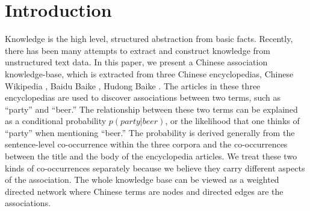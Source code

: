 \section{Introduction}
%
Knowledge is the high level, structured abstraction from basic facts.
Recently, there has been many attempts to extract and construct knowledge
from unstructured text data\cite{WuLWZ12,HoffartSBW13}.
In this paper, we present a Chinese association knowledge-base,
which is extracted from three Chinese encyclopedias,
Chinese Wikipedia \cite{ch-wiki}, Baidu Baike
\cite{baidu-baike}, Hudong Baike \cite{hudong-baike}.
The articles in these three encyclopedias are used to discover associations
between two terms, such as ``party'' and ``beer.''
The relationship between these two terms can be explained as a conditional
probability $p(party|beer)$, or the likelihood
that one thinks of ``party'' when mentioning ``beer.''
The probability is derived generally from the sentence-level co-occurrence
within the three corpora and the co-occurrences between the title and the body
of the encyclopedia articles. We treat these two kinds of co-occurrences
separately because we believe they carry different aspects of the association.
The whole knowledge base can be viewed as a weighted directed network where
Chinese terms are nodes and directed edges are the associations.
%


